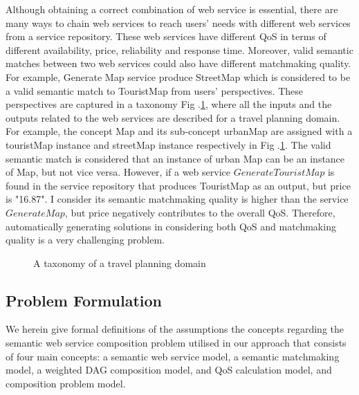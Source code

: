 \documentclass{llncs}
\begin{document}
Although obtaining a correct combination of web service is essential, there are many ways to chain web services to reach users' needs with different web services from a service repository. These web services have different QoS in terms of different availability, price, reliability and response time. Moreover, valid semantic matches between two web services could also have different matchmaking quality. For example, Generate Map service produce StreetMap which is considered to be a valid semantic match to TouristMap from users' perspectives. These perspectives are captured in a taxonomy Fig .\ref{taxonomy}, where all the inputs and the outputs related to the web services are described for a travel planning domain. For example, the concept Map and its sub-concept urbanMap are assigned with a touristMap instance and streetMap instance respectively in Fig .\ref{taxonomy}. The valid semantic match is considered that an instance of urban Map can be an instance of Map, but not vice versa. However, if a web service $GenerateTouristMap$ is found in the service repository that produces TouristMap as an output, but price is "16.87". I consider its semantic matchmaking quality is higher than the service $GenerateMap$, but price negatively contributes to the overall QoS. Therefore, automatically generating solutions in considering both QoS and matchmaking quality is a very challenging problem.  

\begin{figure}[h]
\centering
{}
 \caption{ A taxonomy of a travel planning domain}
 \label{taxonomy}
\end{figure}

\subsection{Problem Formulation}\label{Motivation}

We herein give formal definitions of the assumptions the concepts regarding the semantic web service composition problem utilised in our approach that consists of four main concepts: a semantic web service model, a semantic matchmaking model, a weighted DAG composition model, and QoS calculation model, and composition problem model.
\vspace{0.3cm}
\end{document}
